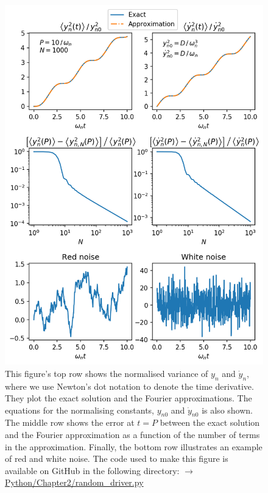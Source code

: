 \begin{figure}
    \centering
    \vspace{-20pt}
    \includegraphics[width=\textwidth,height=0.8\textheight,keepaspectratio]{figures/chapter02/noisy_driver.png}
    \vspace{-10pt}
    \caption{This figure's top row shows the normalised variance of $y_n$ and $\dot{y}_n$, where we use Newton's dot notation to denote the time derivative. They plot the exact solution and the Fourier approximations. The equations for the normalising constants, $y_{n0}$ and $\dot{y}_{n0}$ is also shown. The middle row shows the error at $t=P$ between the exact solution and the Fourier approximation as a function of the number of terms in the approximation. Finally, the bottom row illustrates an example of red and white noise. The code used to make this figure is available on GitHub in the following directory:\newline
    \href{https://github.com/aleksyprok/apkp_thesis/blob/main/Python/Chapter2/random_driver.py}{$\rightarrow$ Python/Chapter2/random\_driver.py}}
    \vspace{-20pt}
    \label{fig:noisy_driver}
\end{figure}

